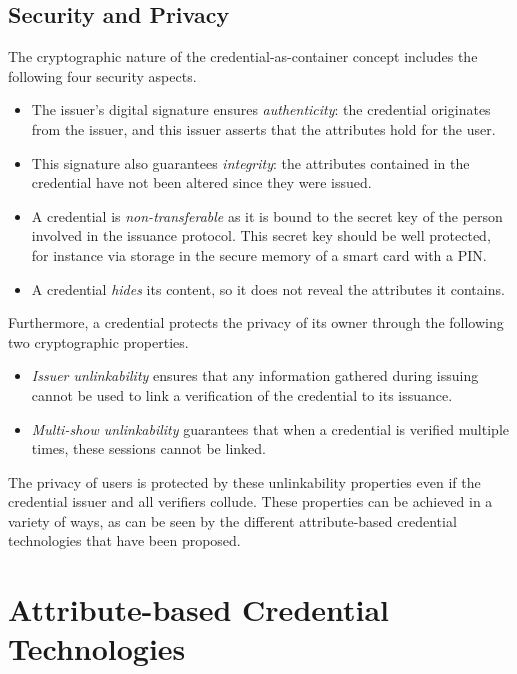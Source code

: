 \subsection{Security and Privacy}

The cryptographic nature of the credential-as-container concept includes the
following four security aspects.
\begin{itemize}
  \item The issuer's digital signature ensures \emph{authenticity}:
     the credential originates from the issuer, and this
    issuer asserts that the attributes hold for the user.
  \item This signature also guarantees \emph{integrity}:  the
    attributes contained in the credential have not been altered since they were
    issued.
  \item A credential is \emph{non-transferable} as
    it is bound to the secret key of the person involved in the issuance
    protocol. This secret key should be well protected, for instance via storage
    in the secure memory of a smart card with a PIN.
  \item A credential \emph{hides} its content, so it does not
    reveal the attributes it contains.
\end{itemize}
Furthermore, a credential protects the privacy of its owner
through the following two cryptographic properties.
\begin{itemize}
  \item \emph{Issuer unlinkability} ensures that
    any information gathered during issuing cannot be used to link a
    verification of the credential to its issuance.
  \item \emph{Multi-show unlinkability}
    guarantees that when a credential is verified multiple times, these sessions
    cannot be linked.
\end{itemize}
The privacy of users is protected by these unlinkability properties even if the
credential issuer and all verifiers collude. These properties can be achieved in
a variety of ways, as can be seen by the different attribute-based credential
technologies that have been proposed.

\section{Attribute-based Credential Technologies}

